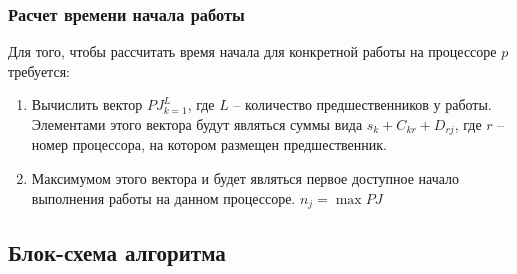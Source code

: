 \subsubsection*{Расчет времени начала работы}
Для того, чтобы рассчитать время начала  для конкретной работы на процессоре $p$ требуется:
\begin{enumerate}
    \item Вычислить вектор $PJ_{k=1}^L$, где $L$ – количество предшественников у работы. Элементами этого вектора будут являться суммы вида $s_k + C_{kr} + D_{rj}$, где $r$ – номер процессора, на котором размещен предшественник.
    \item Максимумом этого вектора и будет являться первое доступное начало выполнения работы на данном процессоре. $n_j=\max{PJ}$
\end{enumerate}

\subsection{Блок-схема алгоритма}
{\small
}